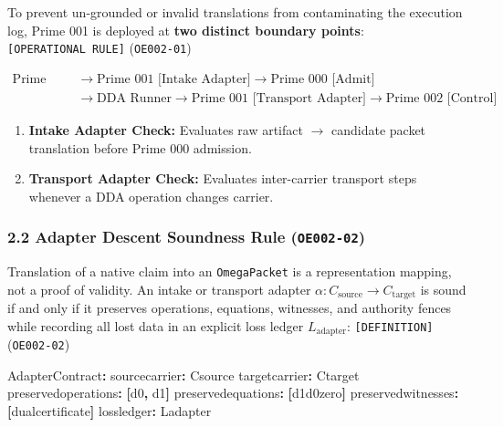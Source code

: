 \documentclass[
  11pt,
]{article}
\newenvironment{Shaded}{}{}
\newcommand{\AttributeTok}[1]{\textcolor[rgb]{0.49,0.56,0.16}{#1}}
\newcommand{\FunctionTok}[1]{\textcolor[rgb]{0.02,0.16,0.49}{#1}}
\newcommand{\KeywordTok}[1]{\textcolor[rgb]{0.00,0.44,0.13}{\textbf{#1}}}
\providecommand{\tightlist}{%
  \setlength{\itemsep}{0pt}\setlength{\parskip}{0pt}}
\renewcommand{\_}{\origunderscore\allowbreak}
\begin{document}
To prevent un-grounded or invalid translations from contaminating the
execution log, Prime 001 is deployed at \textbf{two distinct boundary
points}: \texttt{{[}OPERATIONAL\ RULE{]}} (\texttt{OE002-01})

\[\begin{aligned}
\text{Prime (-1)} &\longrightarrow \text{Prime 001 [Intake Adapter]} \longrightarrow \text{Prime 000 [Admit]} \\
&\longrightarrow \text{DDA Runner} \longrightarrow \text{Prime 001 [Transport Adapter]} \longrightarrow \text{Prime 002 [Control]}
\end{aligned}\]

\begin{enumerate}
\def\labelenumi{\arabic{enumi}.}
\tightlist
\item
  \textbf{Intake Adapter Check:} Evaluates raw artifact \(\to\)
  candidate packet translation before Prime 000 admission.
\item
  \textbf{Transport Adapter Check:} Evaluates inter-carrier transport
  steps whenever a DDA operation changes carrier.
\end{enumerate}

\subsubsection{\texorpdfstring{2.2 Adapter Descent Soundness Rule
(\texttt{OE002-02})}{2.2 Adapter Descent Soundness Rule (OE002-02)}}\label{adapter-descent-soundness-rule-oe002-02}

Translation of a native claim into an \texttt{OmegaPacket} is a
representation mapping, not a proof of validity. An intake or transport
adapter \(\alpha: C_{\text{source}} \to C_{\text{target}}\) is sound if
and only if it preserves operations, equations, witnesses, and authority
fences while recording all lost data in an explicit loss ledger
\(L_{\text{adapter}}\): \texttt{{[}DEFINITION{]}} (\texttt{OE002-02})

\begin{Shaded}
\begin{Highlighting}[]
\FunctionTok{AdapterContract}\KeywordTok{:}
\AttributeTok{  }\FunctionTok{source\_carrier}\KeywordTok{:}\AttributeTok{ C\_source}
\AttributeTok{  }\FunctionTok{target\_carrier}\KeywordTok{:}\AttributeTok{ C\_target}
\AttributeTok{  }\FunctionTok{preserved\_operations}\KeywordTok{:}\AttributeTok{ }\KeywordTok{[}\AttributeTok{d0}\KeywordTok{,}\AttributeTok{ d1}\KeywordTok{]}
\AttributeTok{  }\FunctionTok{preserved\_equations}\KeywordTok{:}\AttributeTok{ }\KeywordTok{[}\AttributeTok{d1\_d0\_zero}\KeywordTok{]}
\AttributeTok{  }\FunctionTok{preserved\_witnesses}\KeywordTok{:}\AttributeTok{ }\KeywordTok{[}\AttributeTok{dual\_certificate}\KeywordTok{]}
\AttributeTok{  }\FunctionTok{loss\_ledger}\KeywordTok{:}\AttributeTok{ L\_adapter}
\end{Highlighting}
\end{Shaded}
\end{document}
